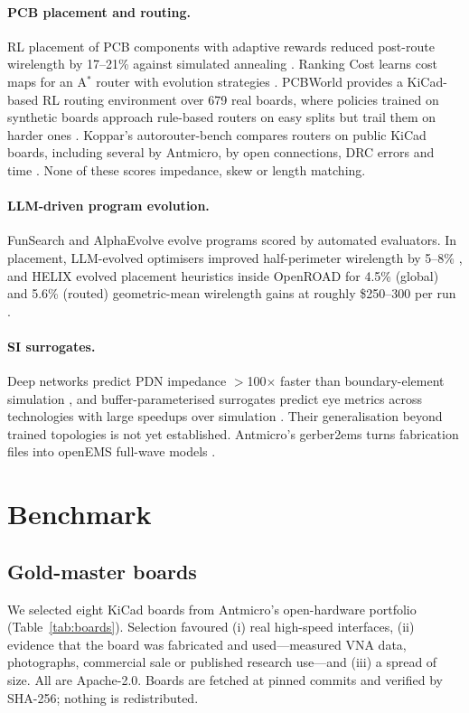 \documentclass[11pt]{article}
\begin{document}
\paragraph{PCB placement and routing.} RL placement of PCB components with adaptive rewards reduced post-route wirelength by 17--21\% against simulated annealing \citep{vassallo2024learning}. Ranking Cost learns cost maps for an A$^*$ router with evolution strategies \citep{huang2021rankingcost}. PCBWorld provides a KiCad-based RL routing environment over 679 real boards, where policies trained on synthetic boards approach rule-based routers on easy splits but trail them on harder ones \citep{song2026pcbworld}. Koppar's autorouter-bench compares routers on public KiCad boards, including several by Antmicro, by open connections, DRC errors and time \citep{zap25}. None of these scores impedance, skew or length matching.

\paragraph{LLM-driven program evolution.} FunSearch \citep{romeraparedes2024funsearch} and AlphaEvolve \citep{novikov2025alphaevolve} evolve programs scored by automated evaluators. In placement, LLM-evolved optimisers improved half-perimeter wirelength by 5--8\% \citep{yao2025evolution}, and HELIX evolved placement heuristics inside OpenROAD for 4.5\% (global) and 5.6\% (routed) geometric-mean wirelength gains at roughly \$250--300 per run \citep{kahng2026helix}.

\paragraph{SI surrogates.} Deep networks predict PDN impedance $>$100$\times$ faster than boundary-element simulation \citep{zhang2021pdn}, and buffer-parameterised surrogates predict eye metrics across technologies with large speedups over simulation \citep{withoft2026surrogate}. Their generalisation beyond trained topologies is not yet established. Antmicro's gerber2ems turns fabrication files into openEMS full-wave models \citep{gerber2ems}.

\section{Benchmark}\label{sec:bench}
\subsection{Gold-master boards}
We selected eight KiCad boards from Antmicro's open-hardware portfolio (Table~\ref{tab:boards}). Selection favoured (i) real high-speed interfaces, (ii) evidence that the board was fabricated and used---measured VNA data, photographs, commercial sale or published research use---and (iii) a spread of size. All are Apache-2.0. Boards are fetched at pinned commits and verified by SHA-256; nothing is redistributed.
\end{document}
